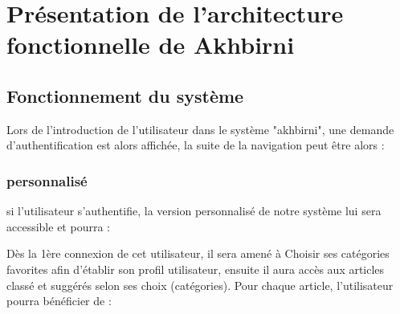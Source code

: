 \section{Présentation de l’architecture fonctionnelle de Akhbirni}

\subsection{Fonctionnement du système}

Lors de l'introduction de l'utilisateur dans le système "akhbirni", une demande d'authentification est alors affichée, la suite de la navigation peut être alors :

\subsubsection{personnalisé}

si l'utilisateur s'authentifie, la version personnalisé de notre système lui sera accessible et pourra :

Dès la 1ère connexion de cet utilisateur, il sera amené à Choisir ses catégories favorites afin d'établir son profil utilisateur, ensuite il aura accès aux articles classé et suggérés selon ses choix (catégories). Pour chaque article, l'utilisateur pourra bénéficier de :
 
